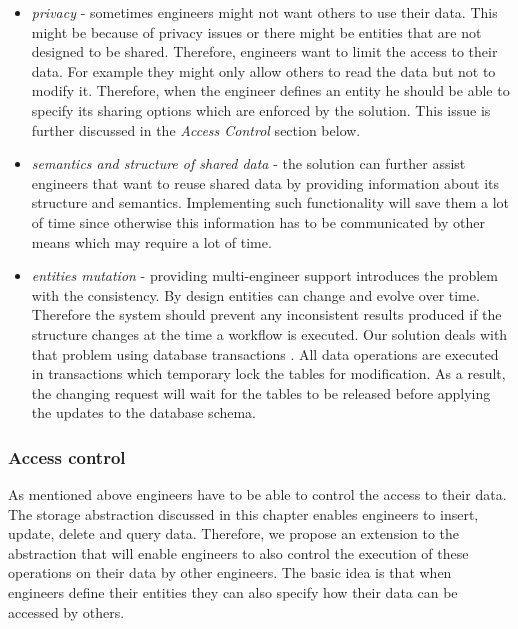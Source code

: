 \begin{itemize}

	\item \textit{privacy} - sometimes engineers might not want others to use their data. This might be because of privacy issues or there might be entities that are not designed to be shared. Therefore, engineers want to limit the access to their data. For example they might only allow others to read the data but not to modify it. Therefore, when the engineer defines an entity he should be able to specify its sharing options which are enforced by the solution. This issue is further discussed in the \textit{Access Control} section below.
	 
	\item \textit{semantics and structure of shared data} - the solution can further assist engineers that want to reuse shared data by providing information about its structure and semantics. Implementing such functionality will save them a lot of time since otherwise this information has to be communicated by other means which may require a lot of time.
	
	\item \textit{entities mutation} - providing multi-engineer support introduces the problem with the consistency. By design entities can change and evolve over time. Therefore the system should prevent any inconsistent results produced if the structure changes at the time a workflow is executed. Our solution deals with that problem using database transactions \cite{gray1981transaction}. All data operations are executed in transactions which temporary lock the tables for modification. As a result, the changing request will wait for the tables to be released before applying the updates to the database schema.
\end{itemize}


\subsubsection{Access control}

As mentioned above engineers have to be able to control the access to their data. The storage abstraction discussed in this chapter enables engineers to insert, update, delete and query data. Therefore, we propose an extension to the abstraction that will enable engineers to also control the execution of these operations on their data by other engineers. The basic idea is that when engineers define their entities they can also specify how their data can be accessed by others.

